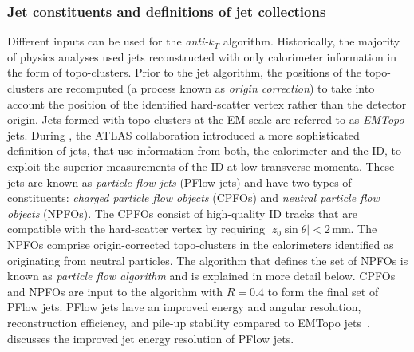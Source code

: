 \subsubsection{Jet constituents and definitions of jet collections}
Different inputs can be used for the \emph{anti-$k_T$} algorithm.
Historically, the majority of physics analyses used jets reconstructed with only calorimeter information in the form of topo-clusters. 
Prior to the jet algorithm, the positions of the topo-clusters are recomputed (a process known as \emph{origin correction}) to take into account the position of the identified hard-scatter vertex rather than the detector origin. 
Jets formed with topo-clusters at the EM scale are referred to as \emph{EMTopo} jets.
During \RunTwo, the ATLAS collaboration introduced a more sophisticated definition of jets, that use information from both, the calorimeter and the ID, to exploit the superior measurements of the ID at low transverse momenta.
These jets are known as \emph{particle flow jets} (PFlow jets) and have two types of constituents: \emph{charged particle flow objects} (CPFOs) and \emph{neutral particle flow objects} (NPFOs). The CPFOs consist of high-quality ID tracks that are compatible with the hard-scatter vertex by requiring $|z_0 \sin \theta| < 2$\,mm.
The NPFOs comprise origin-corrected topo-clusters in the calorimeters identified as originating from neutral particles. The algorithm that defines the set of NPFOs is known as \emph{particle flow algorithm} and is explained in more detail below. CPFOs and NPFOs are input to the \antikt algorithm with $R = 0.4$ to form the final set of PFlow jets.
PFlow jets have an improved energy and angular resolution, reconstruction efficiency, and pile-up stability compared to EMTopo jets~\cite{PERF-2015-09}.
 discusses the improved jet energy resolution of PFlow jets.

